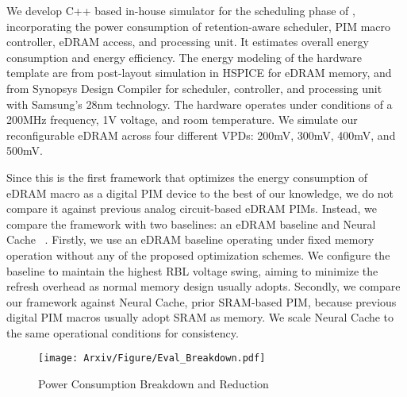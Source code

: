 We develop C++ based in-house simulator for the scheduling phase of \sysname, incorporating the power consumption of retention-aware scheduler, PIM macro controller, eDRAM access, and processing unit. It estimates overall energy consumption and energy efficiency. The energy modeling of the hardware template are from post-layout simulation in HSPICE for eDRAM memory, and from Synopsys Design Compiler for scheduler, controller, and processing unit with Samsung’s 28nm technology. The hardware operates under conditions of a 200MHz frequency, 1V voltage, and room temperature. We simulate our reconfigurable eDRAM across four different VPDs: 200mV, 300mV, 400mV, and 500mV. 


Since this is the first framework that optimizes the energy consumption of eDRAM macro as a digital PIM device to the best of our knowledge, we do not compare it against previous analog circuit-based eDRAM PIMs. Instead, we compare the \sysname framework with two baselines: an eDRAM baseline and Neural Cache ~\cite{eckert2018neural}. Firstly, we use an eDRAM baseline operating under fixed memory operation without any of the proposed optimization schemes. We configure the baseline to maintain the highest RBL voltage swing, aiming to minimize the refresh overhead as normal memory design usually adopts. Secondly, we compare our framework against Neural Cache, prior SRAM-based PIM, because previous digital PIM macros usually adopt SRAM as memory. We scale Neural Cache to the same operational conditions for consistency.

\begin{figure}[t]
\centering
\texttt{[image: Arxiv/Figure/Eval\_Breakdown.pdf]}
\caption{Power Consumption Breakdown and Reduction}
\vspace{-0.1in}
\label{figure_breakdown}
\end{figure}



